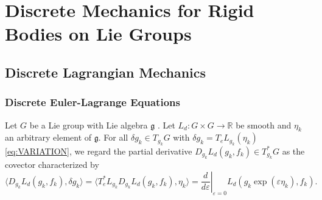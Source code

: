 \chapter{Discrete Mechanics for Rigid Bodies on Lie Groups}
\label{chapter:discrete_mechanics_for_rigid_bodies_on_lie_groups}


\section{Discrete Lagrangian Mechanics}
\label{section:discrete_lagrangian_mechanics}

\subsection{Discrete Euler-Lagrange Equations}

\begin{proposition}
Let $G$ be a Lie group with Lie algebra $\mathfrak g$ \cite{Hall2000LieGroups}. Let 
$L_d:G\times G\to\mathbb R$ be smooth and $\eta_k$ an arbitrary element of $\mathfrak g$. For all $\delta g_k\in T_{g_k}G$ with $\delta g_k = T_eL_{g_k}(\eta_k)$ \eqref{eq:VARIATION},
we regard the partial derivative $D_{g_k}L_d(g_k,f_k)\in T_{g_k}^*G$ as the covector characterized by
\begin{equation} \label{eq:derivative_gk}
\langle D_{g_k}L_d(g_k,f_k),\delta g_k\rangle
=
\langle T_{e}^{*}L_{g_k} D_{g_k}L_d(g_k,f_k),\eta_k \rangle
=
\left.\frac{d}{d\varepsilon}\right|_{\varepsilon=0}L_d(g_k\exp{(\varepsilon \eta_k)},f_k).
\end{equation}
\end{proposition}

